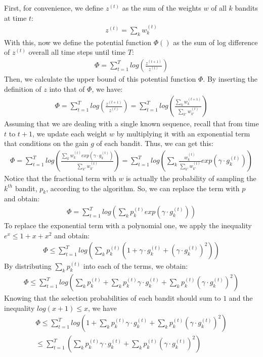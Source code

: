 \documentclass[11pt]{article}
\begin{document}
First, for convenience, we define $z^{(t)}$ as the sum of the weights $w$ of all $k$ bandits at time $t$:
\begin{align}
    z^{(t)} = \sum_{k}w^{(t)}_k
\end{align}
With this, now we define the potential function $\Phi()$ as the sum of log difference of $z^{(t)}$ overall all time steps until time $T$:
\begin{align}
    \Phi = \sum_{t=1}^T log(\frac{z^{(t+1)}}{z^{(t)}})
\end{align}
Then, we calculate the upper bound of this potential function $\Phi$. By inserting the definition of $z$ into that of $\Phi$, we have:
\begin{align}
    \Phi = \sum_{t=1}^T log(\frac{z^{(t+1)}}{z^{(t)}}) = \sum_{t=1}^T log(\frac{\sum_{k}w^{(t+1)}_k}{\sum_{k'}w^{(t)}_{k'}})
\end{align}
Assuming that we are dealing with a single known sequence, recall that from time $t$ to $t+1$, we update each weight $w$ by multiplying it with an exponential term that conditions on the gain $g$ of each bandit. Thus, we can get this:
\begin{align}
    \Phi = \sum_{t=1}^T log(\frac{\sum_{k}w^{(t)}_k exp(\gamma \cdot g_k^{(t)})}{\sum_{k'}w^{(t)}_{k'}}) = \sum_{t=1}^T log(\sum_{k} \frac{w^{(t)}_k }{\sum_{k'}w^{(t)}_{k'}} exp(\gamma \cdot g_k^{(t)}))
\end{align}
Notice that the fractional term with $w$ is actually the probability of sampling the $k^{th}$ bandit, $p_k$, according to the algorithm. So, we can replace the term with $p$ and obtain:
\begin{align}
    \Phi = \sum_{t=1}^T log(\sum_{k} p_k^{(t)} exp(\gamma \cdot g_k^{(t)}))
\end{align}
To replace the exponential term with a polynomial one, we apply the inequality $e^x \leq 1 + x + x^2$ and obtain:
\begin{align}
    \Phi \leq \sum_{t=1}^T log(\sum_{k} p_k^{(t)} (1 + \gamma \cdot g_k^{(t)} + (\gamma \cdot g_k^{(t)})^2))
\end{align}
By distributing $\sum_{k}p_k^{(t)}$ into each of the terms, we obtain:
\begin{align}
    \Phi \leq \sum_{t=1}^T log( \sum_{k}p_k^{(t)} + \sum_{k}p_k^{(t)}\gamma \cdot g_k^{(t)} + \sum_{k}p_k^{(t)}(\gamma \cdot g_k^{(t)})^2)
\end{align}
Knowing that the selection probabilities of each bandit should sum to $1$ and the inequality $log(x+1) \leq x$, we have
\begin{align}
    \Phi \leq \sum_{t=1}^T log( 1 + \sum_{k}p_k^{(t)}\gamma \cdot g_k^{(t)} + \sum_{k}p_k^{(t)}(\gamma \cdot g_k^{(t)})^2)\\
    \leq \sum_{t=1}^T (\sum_{k}p_k^{(t)}\gamma \cdot g_k^{(t)} + \sum_{k}p_k^{(t)}(\gamma \cdot g_k^{(t)})^2)
\end{align}
\end{document}
